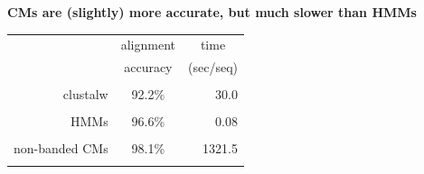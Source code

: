 \documentclass[landscape]{slides}
\begin{document}
%
\begin{slide}
\begin{center}

\textbf{CMs are (slightly) more accurate, but much slower than HMMs}
\end{center}
\medskip
\medskip
\begin{center}

\begin{tabular}{rcr} 
& \multicolumn{1}{c}{alignment} & \multicolumn{1}{c}{time} \\
& \multicolumn{1}{c}{accuracy} & \multicolumn{1}{c}{(sec/seq)} \\ \hline
& \multicolumn{1}{c}{} & \multicolumn{1}{c}{} \\
clustalw & 92.2\% & 30.0 \\ 
& \multicolumn{1}{c}{} & \multicolumn{1}{c}{} \\
HMMs & 96.6\% & 0.08 \\ 
& \multicolumn{1}{c}{} & \multicolumn{1}{c}{} \\
non-banded CMs & 98.1\% & 1321.5 \\ 
& \multicolumn{1}{c}{} & \multicolumn{1}{c}{} \\
\end{tabular}
\end{center}

\vfill
\end{slide}
\end{document}
